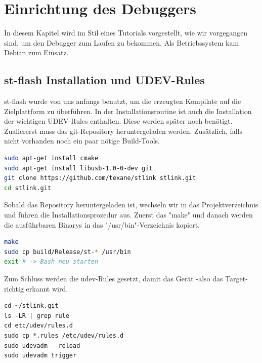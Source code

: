 \section{Einrichtung des Debuggers}
In diesem Kapitel wird im Stil eines Tutorials vorgestellt, wie wir vorgegangen sind, um den Debugger zum Laufen zu bekommen. Als Betriebssystem kam Debian zum Einsatz.
\subsection{st-flash Installation und UDEV-Rules}
st-flash wurde von uns anfangs benutzt, um die erzeugten Kompilate auf die Zielplattform zu überführen. In der Installationsroutine ist auch die Installation der wichtigen UDEV-Rules enthalten. Diese werden später noch benötigt.
Zuallererst muss das git-Repository heruntergeladen werden. Zusätzlich, falls nicht vorhanden noch ein paar nötige Build-Tools.
\begin{lstlisting}[language=sh]
sudo apt-get install cmake
sudo apt-get install libusb-1.0-0-dev git
git clone https://github.com/texane/stlink stlink.git
cd stlink.git
\end{lstlisting}
Sobald das Repository heruntergeladen ist, wechseln wir in das Projektverzeichnis und führen die Installationsprozedur aus. Zuerst das "make" und danach werden die ausführbaren Binarys in das "/usr/bin"-Verzeichnis kopiert.
\begin{lstlisting}[language=sh]
make
sudo cp build/Release/st-* /usr/bin
exit # -> Bash neu starten
\end{lstlisting}
Zum Schluss werden die udev-Rules gesetzt, damit das Gerät -also das Target- richtig erkannt wird.
\begin{lstlisting}
cd ~/stlink.git
ls -LR | grep rule
cd etc/udev/rules.d
sudo cp *.rules /etc/udev/rules.d
sudo udevadm --reload
sudo udevadm trigger
\end{lstlisting}
